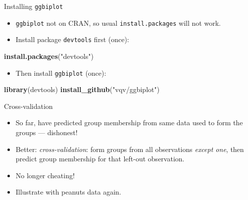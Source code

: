\documentclass[
  ignorenonframetext,
]{beamer}
\newenvironment{Shaded}{\begin{snugshade}}{\end{snugshade}}
\newcommand{\KeywordTok}[1]{\textcolor[rgb]{0.13,0.29,0.53}{\textbf{#1}}}
\newcommand{\NormalTok}[1]{#1}
\newcommand{\StringTok}[1]{\textcolor[rgb]{0.31,0.60,0.02}{#1}}
\providecommand{\tightlist}{%
  \setlength{\itemsep}{0pt}\setlength{\parskip}{0pt}}
\begin{document}
\begin{frame}[fragile]{Installing \texttt{ggbiplot}}
\protect\hypertarget{installing-ggbiplot}{}

\begin{itemize}
\item
  \texttt{ggbiplot} not on CRAN, so usual \texttt{install.packages} will
  not work.
\item
  Install package \texttt{devtools} first (once):
\end{itemize}

\begin{Shaded}
\begin{Highlighting}[]
\KeywordTok{install.packages}\NormalTok{(}\StringTok{"devtools"}\NormalTok{)}
\end{Highlighting}
\end{Shaded}

\begin{itemize}
\tightlist
\item
  Then install \texttt{ggbiplot} (once):
\end{itemize}

\begin{Shaded}
\begin{Highlighting}[]
\KeywordTok{library}\NormalTok{(devtools)}
\KeywordTok{install_github}\NormalTok{(}\StringTok{"vqv/ggbiplot"}\NormalTok{)}
\end{Highlighting}
\end{Shaded}

\end{frame}

\begin{frame}{Cross-validation}
\protect\hypertarget{cross-validation}{}

\begin{itemize}
\item
  So far, have predicted group membership from same data used to form
  the groups --- dishonest!
\item
  Better: \emph{cross-validation}: form groups from all observations
  \emph{except one}, then predict group membership for that left-out
  observation.
\item
  No longer cheating!
\item
  Illustrate with peanuts data again.
\end{itemize}

\end{frame}
\end{document}
